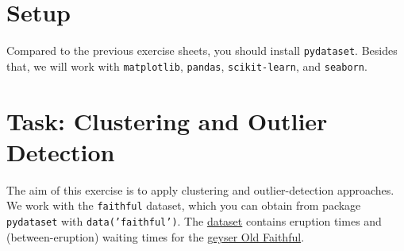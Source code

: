 \documentclass[12pt]{article}
\newcommand{\code}[1]{\textcolor{kitgreen}{\texttt{#1}}}
\begin{document}
\section*{Setup}

Compared to the previous exercise sheets, you should install \code{pydataset}.
Besides that, we will work with \code{matplotlib}, \code{pandas}, \code{scikit-learn}, and \code{seaborn}.

\section*{Task: Clustering and Outlier Detection}

The aim of this exercise is to apply clustering and outlier-detection approaches.
We work with the \code{faithful} dataset, which you can obtain from package \code{pydataset} with \code{data('faithful')}.
The \href{https://www.rdocumentation.org/packages/datasets/versions/3.6.2/topics/faithful}{dataset} contains eruption times and (between-eruption) waiting times for the \href{https://en.wikipedia.org/wiki/Old_Faithful}{geyser Old Faithful}.
\end{document}
